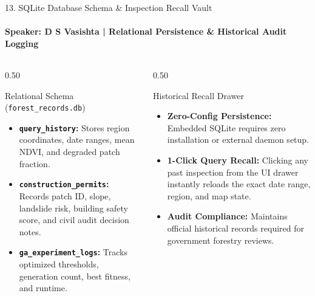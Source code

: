 \documentclass[aspectratio=169, 11pt]{beamer}
\begin{document}
\begin{frame}{13. SQLite Database Schema \& Inspection Recall Vault}
    \framesubtitle{\textbf{\textcolor{amritaGold}{Speaker: D S Vasishta}} \quad | \quad Relational Persistence \& Historical Audit Logging}
    \begin{columns}[c]
        \begin{column}{0.50\textwidth}
            \begin{block}{Relational Schema (\texttt{forest\_records.db})}
                \footnotesize
                \begin{itemize}
                    \item \textbf{\texttt{query\_history}:} Stores region coordinates, date ranges, mean NDVI, and degraded patch fraction.
                    \item \textbf{\texttt{construction\_permits}:} Records patch ID, slope, landslide risk, building safety score, and civil audit decision notes.
                    \item \textbf{\texttt{ga\_experiment\_logs}:} Tracks optimized thresholds, generation count, best fitness, and runtime.
                \end{itemize}
            \end{block}
        \end{column}
        \begin{column}{0.50\textwidth}
            \begin{exampleblock}{Historical Recall Drawer}
                \small
                \begin{itemize}
                    \item \textbf{Zero-Config Persistence:} Embedded SQLite requires zero installation or external daemon setup.
                    \item \textbf{1-Click Query Recall:} Clicking any past inspection from the UI drawer instantly reloads the exact date range, region, and map state.
                    \item \textbf{Audit Compliance:} Maintains official historical records required for government forestry reviews.
                \end{itemize}
            \end{exampleblock}
        \end{column}
    \end{columns}
\end{frame}

\end{document}
